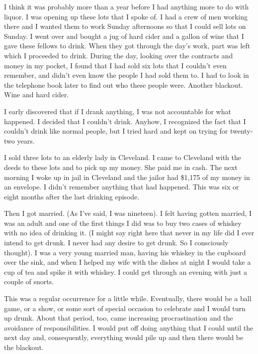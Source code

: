 \begin{biblechapter}
\verse I think it was probably more than a year 
    before I had anything more to do with liquor.
\verse I was opening up these lots that I spoke of.
\verse I had a crew of men working there 
    and I wanted them to work Sunday afternoons 
    so that I could sell lots on Sunday.
\verse I went over and bought a jug of hard cider 
    and a gallon of wine that I gave these fellows to drink.
\verse When they got through the day’s work, 
    part was left which I proceeded to drink.
\verse During the day, looking over the contracts and money in my pocket, 
    I found that I had sold six lots that I couldn’t even remember, 
    and didn’t even know the people I had sold them to.
\verse I had to look in the telephone book later to find out who these people were.
\verse Another blackout.
\verse Wine and hard cider.

\verse I early discovered that if I drank anything, 
    I was not accountable for what happened.
\verse I decided that I couldn’t drink.
\verse Anyhow, I recognized the fact that 
    I couldn’t drink like normal people, 
    but I tried hard 
    and kept on trying for twenty-two years.

\verse I sold three lots to an elderly lady in Cleveland.
\verse I came to Cleveland with the deeds to these lots 
    and to pick up my money.
\verse She paid me in cash.
\verse The next morning I woke up in jail in Cleveland 
    and the jailor had \$1,175 of my money in an envelope.
\verse I didn’t remember anything that had happened.
\verse This was six or eight months after the last drinking episode.

\verse Then I got married.
\verse (As I’ve said, I was nineteen).
\verse I felt having gotten married, 
    I was an adult 
    and one of the first things I did 
    was to buy two cases of whiskey with no idea of drinking it.
\verse (I might say right here 
    that never in my life did I ever intend to get drunk. 
    I never had any desire to get drunk.
    So I consciously thought).
\verse I was a very young married man, 
    having his whiskey in the cupboard over the sink, 
    and when I helped my wife with the dishes at night 
    I would take a cup of tea and spike it with whiskey.
\verse I could get through an evening with just a couple of snorts.

\verse This was a regular occurrence for a little while.
\verse Eventually, there would be a ball game, or a show, 
    or some sort of special occasion to celebrate 
    and I would turn up drunk.
\verse About that period, too, 
    came increasing procrastination 
    and the avoidance of responsibilities.
\verse I would put off doing anything that I could until the next day 
    and, consequently, everything would pile up 
    and then there would be the blackout.


\end{biblechapter}
